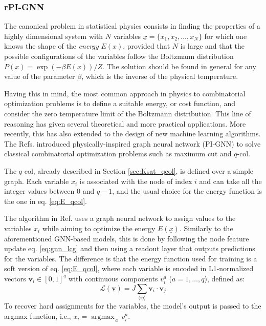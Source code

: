 \documentclass{article}
\DeclareMathOperator*{\argmax}{argmax}
\begin{document}
\subsubsection{rPI-GNN}\label{subsec:PI-GNN}

The canonical problem in statistical physics consists in finding the properties of a highly dimensional system with $N$ variables $\underline{x}=\{x_1, x_2, \ldots, x_N\}$ for which one knows the shape of the \textit{energy} $E(\underline{x})$, provided that $N$ is large and that the possible configurations of the variables follow the Boltzmann distribution $P(\underline{x})=\exp(-\beta E(\underline{x})) / Z$. The solution should be found in general for any value of the parameter $\beta$, which is the inverse of the physical temperature. 

Having this in mind, the most common approach in physics to combinatorial optimization problems is to define a suitable energy, or cost function, and consider the zero temperature limit of the Boltzmann distribution. This line of reasoning has given several theoretical \cite{MezardParisiTSP1986, MezardSP, FranzPRLPspin2001, zdeborova2007phase, krzakala2007gibbs} and more practical \cite{KirkpatrickSA1983, braunstein2005survey, marino_backtracking_2016} applications. More recently, this has also extended to the design of new machine learning algorithms. The Refs. \cite{schuetz2022combinatorial, Schuetz_PIGNNcol_2022} introduced physically-inspired graph neural network (PI-GNN) to solve classical combinatorial optimization problems such as maximum cut and $q$-col. 


The $q$-col, already described in Section \ref{sec:Ksat_qcol}, is defined over a simple graph. Each variable $x_i$ is associated with the node of index $i$ and can take all the integer values between $0$ and $q-1$, and the usual choice for the energy function is the one in eq. \eqref{eq:E_qcol}.

The algorithm in Ref. \cite{Schuetz_PIGNNcol_2022} uses a graph neural network to assign values to the variables $x_i$ while aiming to optimize the energy $E(\underline{x})$. Similarly to the aforementioned GNN-based models, this is done by following the node feature update eq. \eqref{eq:gnn_lcg} and then using a readout layer that outputs predictions for the variables. The difference is that the energy function used for training is a soft version of eq. \eqref{eq:E_qcol}, where each variable is encoded in L1-normalized vectors $\textbf{v}_i \in [0,1]^{q}$ with continuous components $v_i^{a}$ ($a=1,\ldots, q$), defined as:
\begin{equation}
 \mathcal{L}(\underline{\textbf{v}}) = J \sum_{\langle ij \rangle} \textbf{v}_i \cdot \textbf{v}_j \label{eq:loss_qcol}
\end{equation}
To recover hard assignments for the variables, the model's output is passed to the argmax function, i.e., $x_i =  \argmax_{\, a} \, v_i^a$.
\end{document}
